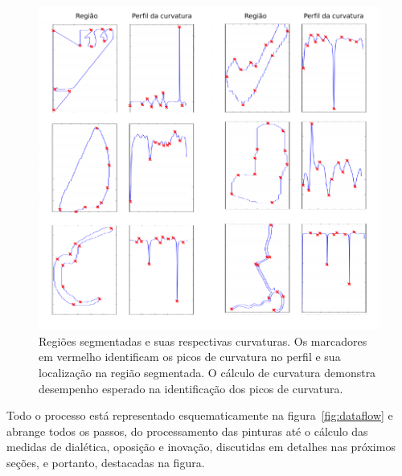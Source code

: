 \begin{figure}[h!]
\begin{center}
            \caption{Regiões segmentadas e suas respectivas
        curvaturas. Os marcadores em vermelho identificam os picos de
        curvatura no perfil e sua localização na região segmentada. O
        cálculo de curvatura demonstra desempenho esperado na
        identificação dos picos de
        curvatura.}  \label{fig:passos_curvatura} \includegraphics[scale=1]{figs/passos_curvatura} \fonteminha
\end{center}
\end{figure}

Todo o processo está representado esquematicamente na figura~\ref{fig:dataflow}
e abrange todos os passos, do processamento das pinturas até o
cálculo das medidas de dialética, oposição e inovação, discutidas em detalhes nas
próximos seções, e portanto, destacadas na figura.

